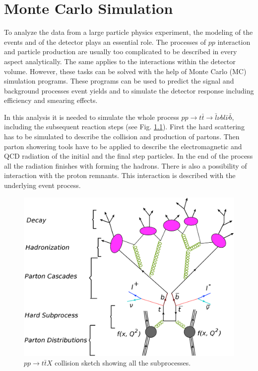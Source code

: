 \chapter{Monte Carlo Simulation}\label{chapt:MC}

To analyze the data from a large particle physics experiment, the modeling of the events and of the detector
plays an essential role. The processes of $pp$ interaction and particle production are usually too complicated
to be described in every aspect analytically. The same applies to the interactions within the detector volume. However, these 
tasks can be solved with the help of Monte Carlo (MC) simulation programs. These programs can be used to predict
the signal and background processes event yields and to simulate the detector response including efficiency and smearing effects.

In this analysis it is needed to simulate the whole process $pp \rightarrow t\bar{t} \rightarrow \bar{l}\nu bl\bar{\nu}\bar{b}$, 
including the subsequent reaction steps (see Fig. \ref{fig:pp_all}). First the hard scattering has to be
simulated to describe the collision and production of partons. Then parton showering tools have to be applied 
to describe the electromagnetic and QCD radiation of the initial and the final step particles. In the end of the 
process all the radiation finishes with forming the hadrons. There is also a possibility of interaction with the 
proton remnants. This interaction is described with the underlying event process.

\begin{figure}[h]
  \centering
  \includegraphics[width=1.0\textwidth]{03_simulation/plots/pp_all_proc.png}
  \caption{$pp \rightarrow t\bar{t}X$ collision sketch showing all the subprocesses.}
  \label{fig:pp_all}
\end{figure}

